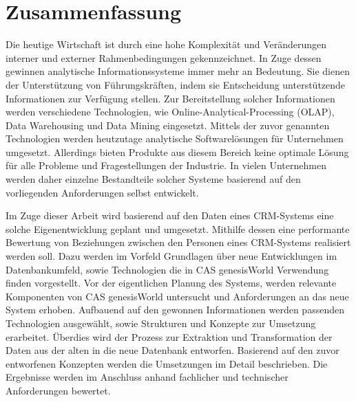 
\chapter*{\centering Zusammenfassung}

Die heutige Wirtschaft ist durch eine hohe Komplexität und Veränderungen interner und externer Rahmenbedingungen gekennzeichnet. In Zuge dessen gewinnen analytische Informationssysteme immer mehr an Bedeutung. Sie dienen der Unterstützung von Führungskräften, indem sie Entscheidung unterstützende Informationen zur Verfügung stellen. Zur Bereitstellung solcher Informationen werden verschiedene Technologien, wie Online-Analytical-Processing (OLAP), Data Warehousing und Data Mining eingesetzt. Mittels der zuvor genannten Technologien werden heutzutage analytische Softwarelösungen für Unternehmen umgesetzt. Allerdings bieten Produkte aus diesem Bereich keine optimale Lösung für alle Probleme und Fragestellungen der Industrie. In vielen Unternehmen werden daher einzelne Bestandteile solcher Systeme basierend auf den vorliegenden Anforderungen selbst entwickelt.

Im Zuge dieser Arbeit wird basierend auf den Daten eines CRM-Systems eine solche Eigenentwicklung geplant und umgesetzt. Mithilfe dessen eine performante Bewertung von Beziehungen zwischen den Personen eines CRM-Systems realisiert werden soll. Dazu werden im Vorfeld Grundlagen über neue Entwicklungen im Datenbankumfeld, sowie Technologien die in CAS genesisWorld Verwendung finden vorgestellt. Vor der eigentlichen Planung des Systems, werden relevante Komponenten von CAS genesisWorld untersucht und Anforderungen an das neue System erhoben. Aufbauend auf den gewonnen Informationen  werden passenden Technologien ausgewählt, sowie Strukturen und Konzepte zur Umsetzung erarbeitet. Überdies wird der Prozess zur Extraktion und Transformation der Daten aus der alten in die neue Datenbank entworfen. Basierend auf den zuvor entworfenen Konzepten werden die Umsetzungen im Detail beschrieben. Die Ergebnisse werden im Anschluss anhand fachlicher und technischer Anforderungen bewertet.